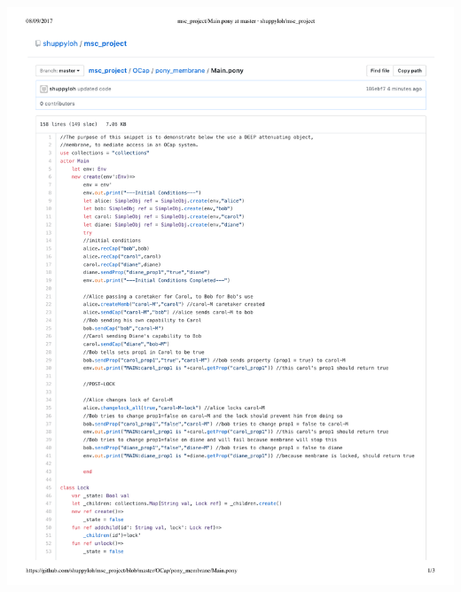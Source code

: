 \documentclass[a4paper,11pt,twoside]{article}
\begin{document}
{\begin{minipage}{\textwidth}
\includegraphics[width=\textwidth,valign=t,page=2]{figures/code_Membrane.pdf}
\end{minipage}
\begin{minipage}{\textwidth}

\end{minipage}}
\end{document}
